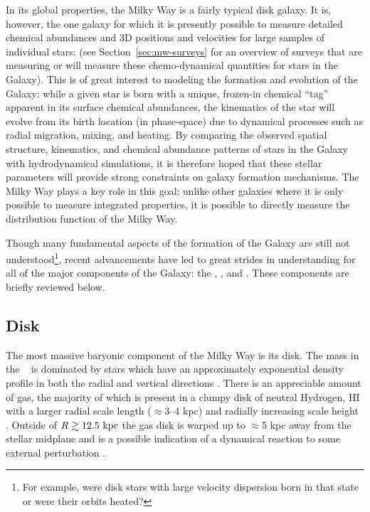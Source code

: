 In its global properties, the Milky Way is a fairly typical disk galaxy. It is,
however, the one galaxy for which it is presently possible to measure detailed
chemical abundances and 3D positions and velocities for large samples of
individual stars: (see Section~\ref{sec:mw-surveys} for an overview of surveys
that are measuring or will measure these chemo-dynamical quantities for stars in
the Galaxy). This is of great interest to modeling the formation and evolution
of the Galaxy: while a given star is born with a unique, frozen-in chemical
``tag'' apparent in its surface chemical abundances, the kinematics of the star
will evolve from its birth location (in phase-space) due to dynamical processes
such as radial migration, mixing, and heating. By comparing the observed spatial
structure, kinematics, and chemical abundance patterns of stars in the Galaxy
with hydrodynamical simulations, it is therefore hoped that these stellar
parameters will provide strong constraints on galaxy formation mechanisms. The
Milky Way plays a key role in this goal: unlike other galaxies where it is only
possible to measure integrated properties, it is possible to directly measure
the distribution function of the Milky Way.

Though many fundamental aspects of the formation of the Galaxy are still not
understood\footnote{For example, were disk stars with large velocity dispersion
born in that state or were their orbits heated?}, recent advancements have led
to great strides in understanding for all of the major components of the Galaxy:
the \mwdisk, \mwbulge, and \mwhalo. These components are briefly reviewed below.

\subsection{Disk}

The most massive baryonic component of the Milky Way is its disk. The mass in
the \mwdisk\ \citep[$M_d \approx 5 \times 10^{10}~\msun$;][]{mcmillan11} is
dominated by stars which have an approximately exponential density profile in
both the radial and vertical directions \citep[with scale lengths of $\approx$2
--3 kpc and $\approx$250--800 pc, respectively, from thin to thick
disk;][]{ojha01, juric08, mcmillan11, bovy12-spatialMAP}. There is an
appreciable amount of gas, the majority of which is present in a clumpy disk of
neutral Hydrogen, HI \citep[$M_{\rm HI} \approx 8 \times
10^9~\msun$;][]{kalberla09} with a larger radial scale length ($\approx$3--4
kpc) and radially increasing scale height \citep[$\approx$100 pc at $R=8~\kpc$
to $\approx$1 kpc at $R=25~\kpc$;][]{wouterloot90, merrifield92}. Outside of $R
\gtrsim 12.5~\mathrm{kpc}$ the gas disk is warped up to $\approx$5 kpc away from the
stellar midplane \citep{henderson82, kalberla07} and is a possible indication of
a dynamical reaction to some external perturbation \citep[e.g.,][]{bekki12}.

